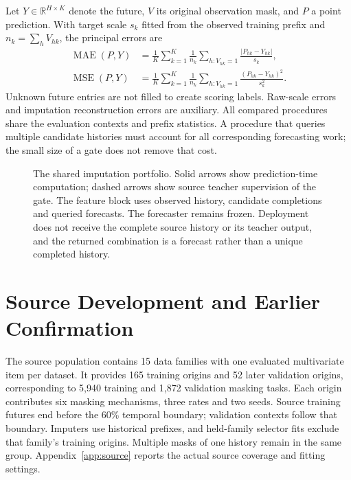\documentclass{article}
\begin{document}
Let $Y\in\mathbb R^{H\times K}$ denote the future, $V$ its original observation mask, and $P$ a point prediction. With target scale $s_k$ fitted from the observed training prefix and $n_k=\sum_hV_{hk}$, the principal errors are
\begin{align}
 \operatorname{MAE}(P,Y)&=\frac1K\sum_{k=1}^{K}\frac1{n_k}\sum_{h:V_{hk}=1}\frac{|P_{hk}-Y_{hk}|}{s_k},\\
 \operatorname{MSE}(P,Y)&=\frac1K\sum_{k=1}^{K}\frac1{n_k}\sum_{h:V_{hk}=1}\frac{(P_{hk}-Y_{hk})^2}{s_k^2}.
\end{align}
Unknown future entries are not filled to create scoring labels. Raw-scale errors and imputation reconstruction errors are auxiliary. All compared procedures share the evaluation contexts and prefix statistics. A procedure that queries multiple candidate histories must account for all corresponding forecasting work; the small size of a gate does not remove that cost.



\begin{figure}[t]
\centering

\caption{The shared imputation portfolio. Solid arrows show prediction-time computation; dashed arrows show source teacher supervision of the gate. The feature block uses observed history, candidate completions and queried forecasts. The forecaster remains frozen. Deployment does not receive the complete source history or its teacher output, and the returned combination is a forecast rather than a unique completed history.}
\label{fig:r6_portfolio}
\end{figure}

\section{Source Development and Earlier Confirmation}
\label{sec:development}

The source population contains 15 data families with one evaluated multivariate item per dataset. It provides 165 training origins and 52 later validation origins, corresponding to 5,940 training and 1,872 validation masking tasks. Each origin contributes six masking mechanisms, three rates and two seeds. Source training futures end before the 60\% temporal boundary; validation contexts follow that boundary. Imputers use historical prefixes, and held-family selector fits exclude that family's training origins. Multiple masks of one history remain in the same group. Appendix~\ref{app:source} reports the actual source coverage and fitting settings.
\end{document}
